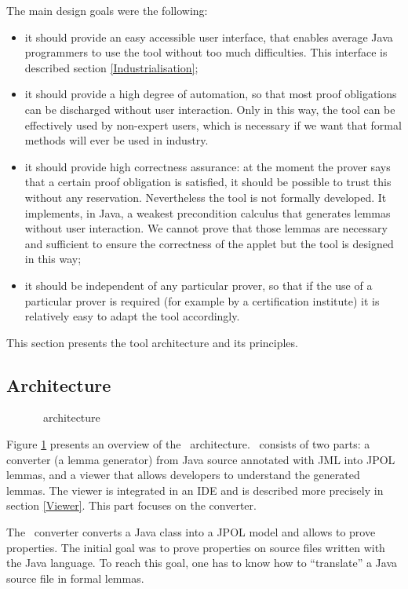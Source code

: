 \label{JavaAppletCorrectnessKit}
 The main design goals were the following:
 \begin{itemize}
 \item it should provide an easy accessible user interface, that enables average Java programmers to use the tool
 without too much difficulties. This interface is
described section \ref{Industrialisation};
 \item it should provide a high degree of automation, so that most proof obligations can be discharged without user
 interaction. Only in this way, the tool can be effectively used by non-expert users, which is necessary if we want that
 formal methods will ever be used in industry. 
 \item it should provide high correctness assurance: at the moment the prover says that a certain proof obligation
is satisfied, it should be possible to trust this without any reservation. Nevertheless
the tool is not formally developed. It implements, in Java, a weakest precondition calculus that
generates lemmas without user interaction. We cannot prove that those lemmas are necessary and sufficient to
ensure the correctness of the applet but the tool is designed in this way;
 \item it should be independent of any particular prover, so that if the use of a particular prover is
 required (for example by a certification institute) it is relatively easy to adapt the tool accordingly.
\end{itemize}


This section presents the tool architecture and its principles.
\subsection{Architecture}
\begin{figure}[tp]
 \caption{\sc \JACK\ architecture}
 \label{JACKarchitecture}
\end{figure}
 Figure \ref{JACKarchitecture} presents an overview of the \JACK\
 architecture.  \JACK\ consists of two parts: a converter (a lemma generator) from
 Java source annotated with JML into JPOL lemmas, and a viewer that
 allows developers to understand the generated
 lemmas.  The viewer is integrated in an IDE and is described more precisely in section
 \ref{Viewer}.  This part focuses on the converter.

 The \JACK\ converter converts a Java class into a JPOL model and allows to
 prove properties. 
 The initial goal was to prove properties on source files written with the Java
 language.  To reach this goal, one has to know how to ``translate'' a
 Java source file in formal lemmas.  

